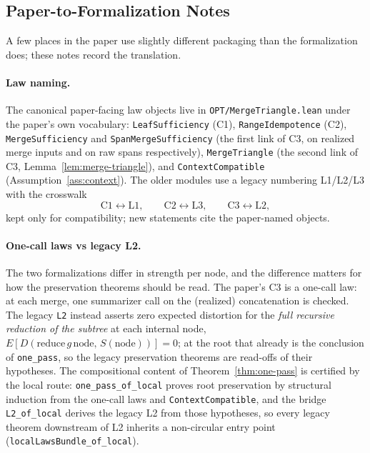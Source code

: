 \subsection{Paper-to-Formalization Notes}

A few places in the paper use slightly different packaging than the
formalization does; these notes record the translation.

\paragraph{Law naming.} The canonical paper-facing law objects live in
\texttt{OPT/MergeTriangle.lean} under the paper's own vocabulary:
\texttt{LeafSufficiency} (C1), \texttt{RangeIdempotence} (C2),
\texttt{MergeSufficiency} and \texttt{SpanMergeSufficiency} (the first
link of C3, on realized merge inputs and on raw spans respectively),
\texttt{MergeTriangle} (the second link of C3,
Lemma~\ref{lem:merge-triangle}), and \texttt{ContextCompatible}
(Assumption~\ref{ass:context}). The older modules use a legacy numbering
L1/L2/L3 with the crosswalk
\[
\text{C1} \leftrightarrow \text{L1},\qquad
\text{C2} \leftrightarrow \text{L3},\qquad
\text{C3} \leftrightarrow \text{L2},
\]
kept only for compatibility; new statements cite the paper-named objects.

\paragraph{One-call laws vs legacy L2.} The two formalizations differ in
strength per node, and the difference matters for how the preservation
theorems should be read. The paper's C3 is a one-call law: at each merge,
one summarizer call on the (realized) concatenation is checked. The legacy
\texttt{L2} instead asserts zero expected distortion for the \emph{full
recursive reduction of the subtree} at each internal node,
$E[D(\mathrm{reduce}\,g\,\mathrm{node},\,S(\mathrm{node}))]=0$; at the root
that already is the conclusion of \texttt{one\_pass}, so the legacy
preservation theorems are read-offs of their hypotheses. The compositional
content of Theorem~\ref{thm:one-pass} is certified by the local route:
\texttt{one\_pass\_of\_local} proves root preservation by structural
induction from the one-call laws and \texttt{ContextCompatible}, and the
bridge \texttt{L2\_of\_local} derives the legacy L2 from those hypotheses,
so every legacy theorem downstream of L2 inherits a non-circular entry
point (\texttt{localLawsBundle\_of\_local}).


